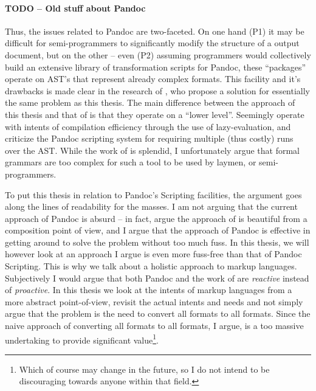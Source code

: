 \documentclass{scrreprt}
\begin{document}
\paragraph{TODO -- Old stuff about Pandoc}

Thus, the issues related to Pandoc are two-faceted. On one hand (P1) it may be difficult for semi-programmers to significantly modify the structure of a output document, but on the other -- even (P2) assuming programmers would collectively build an extensive library of transformation scripts for Pandoc, these ``packages'' operate on AST's that represent already complex formats. This facility and it's drawbacks is made clear in the research of \citet{krijnen}, who propose a solution for essentially the same problem as this thesis. The main difference between the approach of this thesis and that of \citet{krijnen} is that they operate on a ``lower level''. Seemingly \citet{krijnen} operate with intents of compilation efficiency through the use of lazy-evaluation, and criticize the Pandoc scripting system for requiring multiple (thus costly) runs over the AST. While the work of \citet{krijnen} is splendid, I unfortunately argue that formal grammars are too complex for such a tool to be used by laymen, or semi-programmers.

To put this thesis in relation to Pandoc's Scripting facilities, the argument goes along the lines of readability for the masses. I am not arguing that the current approach of Pandoc is absurd -- in fact, argue the approach of \citet{krijnen} is beautiful from a composition point of view, and I argue that the approach of Pandoc is effective in getting around to solve the problem without too much fuss. In this thesis, we will however look at an approach I argue is even more fuss-free than that of Pandoc Scripting. This is why we talk about a holistic approach to markup languages. Subjectively I would argue that both Pandoc and the work of \citet{krijnen} are \emph{reactive} instead of \emph{proactive}. In this thesis we look at the intents of markup languages from a more abstract point-of-view, revisit the actual intents and needs and not simply argue that the problem is the need to convert all formats to all formats. Since the naive approach of converting all formats to all formats, I argue, is a too massive undertaking to provide significant value\footnote{Which of course may change in the future, so I do not intend to be discouraging towards anyone within that field.}.
\end{document}
